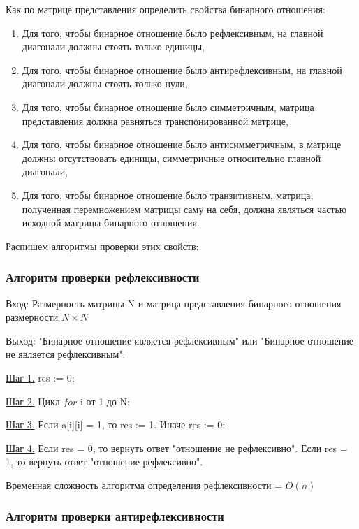 \documentclass[bachelor, och, labwork]{shiza}
\begin{document}
		Как по матрице представления определить свойства бинарного отношения:
	\begin{enumerate}
		\item Для того, чтобы бинарное отношение было $\textit{рефлексивным}$, на главной  диагонали должны стоять только единицы,
		\item Для того, чтобы бинарное отношение было $\textit{антирефлексивным}$, на главной  диагонали должны стоять только нули,
		\item Для того, чтобы бинарное отношение было $\textit{симметричным}$, матрица представления должна равняться транспонированной матрице,
		\item Для того, чтобы бинарное отношение было $\textit{антисимметричным}$, в матрице должны отсутствовать единицы, симметричные относительно главной диагонали,
		\item Для того, чтобы бинарное отношение было $\textit{транзитивным}$, матрица, полученная перемножением матрицы саму на себя, должна являться частью исходной матрицы бинарного отношения.

	\end{enumerate}
				
	Распишем алгоритмы проверки этих свойств:
	
	\subsubsection{Алгоритм проверки рефлексивности}
	
	$\textit{Вход:}$ Размерность матрицы N и матрица представления бинарного отношения размерности $N \times N$
	
	$\textit{Выход:}$  "Бинарное отношение является рефлексивным" или "Бинарное отношение не является рефлексивным".
	
	\underline{Шаг 1.} res := 0;
	
	\underline{Шаг 2.} Цикл $for$ i от 1 до N;
	
	\underline{Шаг 3.} Если a[i][i] = 1, то res := 1. Иначе res := 0;
	
	\underline{Шаг 4.} Если res = 0, то вернуть ответ "отношение не рефлексивно". Если res = 1, то вернуть ответ "отношение рефлексивно".
	
	Временная сложность алгоритма определения рефлексивности = $O(n)$
	
	\subsubsection{Алгоритм проверки антирефлексивности}
\end{document}
